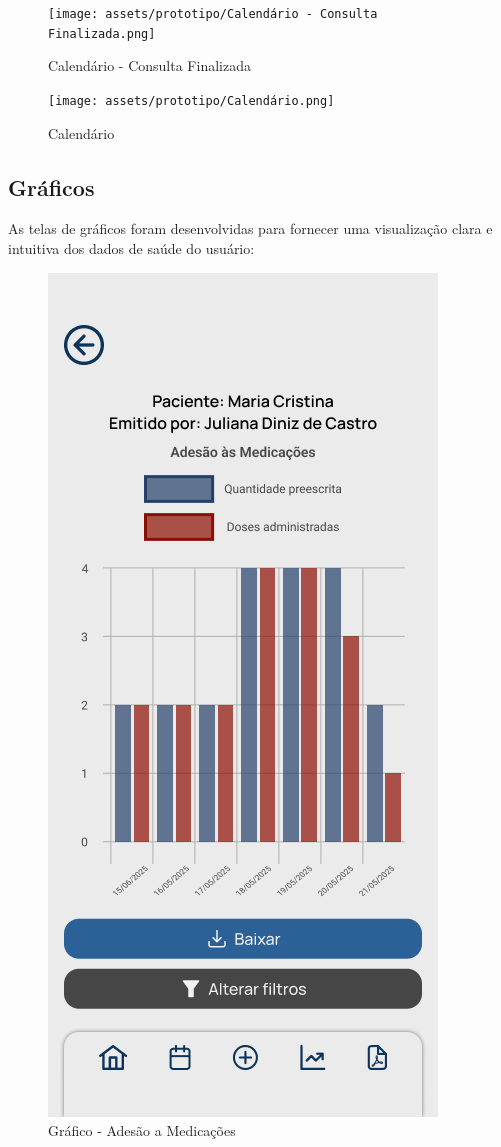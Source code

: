 \begin{figure}[!htbp]
	\centering
	\texttt{[image: assets/prototipo/Calendário - Consulta Finalizada.png]}
	\caption{Calendário - Consulta Finalizada}
	\label{calendario_consulta_finalizada}
\end{figure}

\begin{figure}[!htbp]
	\centering
	\texttt{[image: assets/prototipo/Calendário.png]}
	\caption{Calendário}
	\label{calendario}
\end{figure}

\subsection{Gráficos}

As telas de gráficos foram desenvolvidas para fornecer uma visualização clara e intuitiva dos dados de saúde do usuário:

\begin{figure}[!htbp]
	\centering
	\includegraphics[width=0.6\linewidth]{assets/prototipo/Gráfico - Adesão a Medicações.png}
	\caption{Gráfico - Adesão a Medicações}
	\label{grafico_adesao_medicacoes}
\end{figure}

